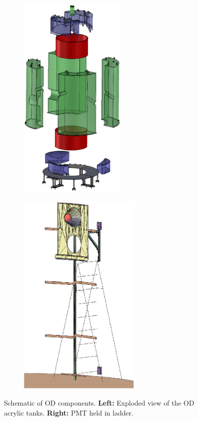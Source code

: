 \begin{figure}[!tbph]
  \begin{subfigure}{.5\textwidth}
  \centering
  \includegraphics[height=10cm]{Figures/LZ/OD_Tanks_CAD.png}
  \label{fig:foam_saving}
  \end{subfigure}
  \begin{subfigure}{.5\textwidth}
  \centering
  \includegraphics[height=10cm]{Figures/LZ/pmt_in_ladder.png}
  \label{fig:SAT_foam_guys}
  \end{subfigure}
\caption{Schematic of OD components. \textbf{Left:} Exploded view of the OD acrylic tanks. \textbf{Right:} PMT held in ladder.}
\label{fig:LZ_OD_schematic}
\end{figure}

